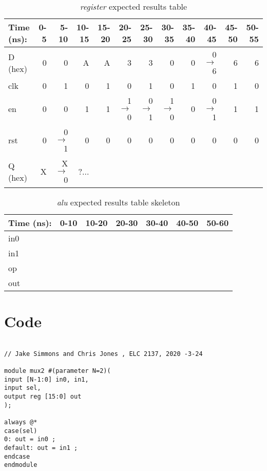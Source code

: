 \documentclass[11pt]{article}
\begin{document}
\begin{table*}[ht]\centering
	\caption{\textit{register} expected results table}
	\label{ALU:tbl:register_ERT}\medskip
	\begin{tabular}{l|rrrrrrrrrrr}
		Time (ns): & 0-5 & 5-10 & 10-15 & 15-20 & 20-25 & 25-30 & 30-35 & 35-40
		& 40-45 & 45-50 & 50-55 \\
		\midrule
		D (hex) & 0 & 0     & A & A & 3         & 3       & 0           & 0 & 
		0$\to$6 & 6 & 6 \\
		clk     & 0 & 1     & 0 & 1 & 0         & 1       & 0           & 1 & 0 
		& 1 & 0 \\
		en    & 0 & 0       & 1 & 1 & 1$\to$0 & 0$\to$1 & 1$\to$0 & 0 & 0$\to$1
		& 1 & 1 \\
		rst   & 0 & 0$\to$1 & 0 & 0 & 0          & 0     & 0       & 0 & 0
		& 0 & 0 \\
		\midrule
		Q (hex) & X & X$\to$0 & ?... &  &  &  & & & & & \\
		\bottomrule
	\end{tabular}
\end{table*}
\begin{table*}[ht]\centering
	\caption{\textit{alu} expected results table skeleton}
	\label{ALU:tbl:alu_ERT}\medskip
	\begin{tabular}{l|rrrrrr}
		Time (ns): & 0-10 & 10-20 & 20-30 & 30-40 & 40-50 & 50-60 \\
		\midrule
		in0 &  &  &  &  &  &  \\
		in1 &  &  &  &  &  &  \\
		op    &  &  &  &  &  &  \\
		\midrule
		out &  &  &  &  &  &  \\
		\bottomrule
	\end{tabular}
\end{table*}


\section*{Code}

\begin{lstlisting}[style=Verilog,caption=Mux 2 Source File ,label=code:ex ]

// Jake Simmons and Chris Jones , ELC 2137, 2020 -3-24

module mux2 #(parameter N=2)(
input [N-1:0] in0, in1,
input sel,
output reg [15:0] out
);

always @*
case(sel)
0: out = in0 ;
default: out = in1 ;
endcase
endmodule



\end{lstlisting}
\end{document}
